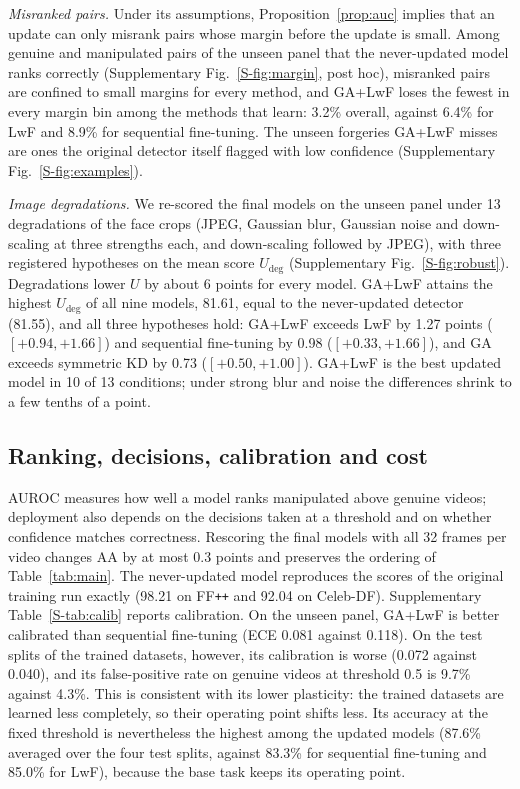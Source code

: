 \documentclass[journal]{IEEEtran}
\newcommand{\ffpp}{FF\texttt{++}}
\begin{document}
\textit{Misranked pairs.} Under its assumptions, Proposition~\ref{prop:auc} implies that an update can only misrank pairs whose margin before the update is small. Among genuine and manipulated pairs of the unseen panel that the never-updated model ranks correctly (Supplementary Fig.~\ref{S-fig:margin}, post hoc), misranked pairs are confined to small margins for every method, and GA+LwF loses the fewest in every margin bin among the methods that learn: 3.2\% overall, against 6.4\% for LwF and 8.9\% for sequential fine-tuning. The unseen forgeries GA+LwF misses are ones the original detector itself flagged with low confidence (Supplementary Fig.~\ref{S-fig:examples}).

\textit{Image degradations.}\label{sec:robust} We re-scored the final models on the unseen panel under 13 degradations of the face crops (JPEG, Gaussian blur, Gaussian noise and down-scaling at three strengths each, and down-scaling followed by JPEG), with three registered hypotheses on the mean score $U_{\mathrm{deg}}$ (Supplementary Fig.~\ref{S-fig:robust}). Degradations lower $U$ by about 6 points for every model. GA+LwF attains the highest $U_{\mathrm{deg}}$ of all nine models, 81.61, equal to the never-updated detector (81.55), and all three hypotheses hold: GA+LwF exceeds LwF by 1.27 points ($[+0.94,+1.66]$) and sequential fine-tuning by 0.98 ($[+0.33,+1.66]$), and GA exceeds symmetric KD by 0.73 ($[+0.50,+1.00]$). GA+LwF is the best updated model in 10 of 13 conditions; under strong blur and noise the differences shrink to a few tenths of a point.

\subsection{Ranking, decisions, calibration and cost}
\label{sec:calib}
AUROC measures how well a model ranks manipulated above genuine videos; deployment also depends on the decisions taken at a threshold and on whether confidence matches correctness. Rescoring the final models with all 32 frames per video changes AA by at most 0.3 points and preserves the ordering of Table~\ref{tab:main}. The never-updated model reproduces the scores of the original training run exactly (98.21 on \ffpp{} and 92.04 on Celeb-DF). Supplementary Table~\ref{S-tab:calib} reports calibration. On the unseen panel, GA+LwF is better calibrated than sequential fine-tuning (ECE 0.081 against 0.118). On the test splits of the trained datasets, however, its calibration is worse (0.072 against 0.040), and its false-positive rate on genuine videos at threshold 0.5 is 9.7\% against 4.3\%. This is consistent with its lower plasticity: the trained datasets are learned less completely, so their operating point shifts less. Its accuracy at the fixed threshold is nevertheless the highest among the updated models (87.6\% averaged over the four test splits, against 83.3\% for sequential fine-tuning and 85.0\% for LwF), because the base task keeps its operating point.
\end{document}
